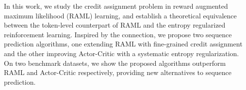 In this work, we study the credit assignment problem in reward augmented maximum likelihood (RAML) learning, and establish a theoretical equivalence between the token-level counterpart of RAML and the entropy regularized reinforcement learning. Inspired by the connection, we propose two sequence prediction algorithms, one extending RAML with fine-grained credit assignment and the other improving Actor-Critic with a systematic entropy regularization. On two benchmark datasets, we show the proposed algorithms outperform RAML and Actor-Critic respectively, providing new alternatives to sequence prediction.
